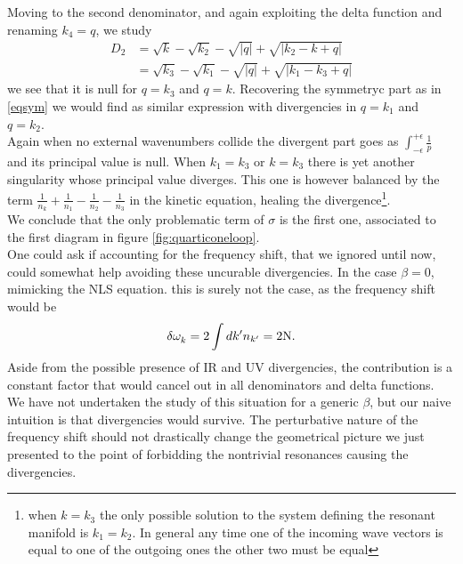     Moving to the second denominator, and again exploiting the delta function and renaming $k_4 = q$, we study
    \begin{equation}
        \begin{aligned}
      D_2 &= \sqrt{k} - \sqrt{k_2} - \sqrt{|q|} + \sqrt{|k_2-k + q|} \\
      &= \sqrt{k_3} - \sqrt{k_1} - \sqrt{|q|} + \sqrt{|k_1-k_3 + q|}
        \end{aligned}
    \end{equation}
    we see that it is null for $q = k_3$ and $q = k$. Recovering the symmetryc part as in \eqref{eqsym} we would find as similar expression with divergencies in $q = k_1$ and $q = k_2$. \\
    Again when no external wavenumbers collide the divergent part goes as $\int_{-\epsilon}^{+\epsilon}\frac{1}{p}$ and its principal value is null. When $k_1 = k_3$ or $k = k_3$ there is yet another singularity whose principal value diverges. This one is however balanced by the term $\frac{1}{n_k} + \frac{1}{n_1} -\frac{1}{n_2} -\frac{1}{n_3}$ in the kinetic equation, healing the divergence\footnote{
    when $k = k_3$ the only possible solution to the system defining the resonant manifold is $k_1 = k_2$.
    In general any time one of the incoming wave vectors is equal to one of the outgoing ones the other two must be equal}.\\
    We conclude that the only problematic term of $\sigma$ is the first one, associated to the first diagram in figure \ref{fig:quarticoneloop}. \\
    
    One could ask if accounting for the frequency shift, that we ignored until now, could somewhat help avoiding these uncurable divergencies. In the case
    $\beta = 0$, mimicking the NLS equation. this is surely not the case, as the frequency shift would be
    \begin{equation}
        \delta \omega^{}_k = 2\int dk' n_{k'} = 2 \mathrm{N}. 
    \end{equation}
    Aside from the possible presence of IR and UV divergencies, the contribution is a constant factor that would cancel out in all denominators and delta functions.\\
    We have not undertaken the study of this situation for a generic $\beta$, but our naive intuition is that divergencies would survive. The perturbative nature of the frequency shift should not drastically change the geometrical picture we just presented to the point of forbidding the nontrivial resonances causing the divergencies.\\
